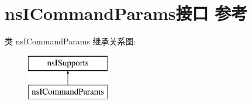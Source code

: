 \hypertarget{interfacens_i_command_params}{}\section{ns\+I\+Command\+Params接口 参考}
\label{interfacens_i_command_params}
类 ns\+I\+Command\+Params 继承关系图\+:\begin{figure}[H]
\begin{center}
\leavevmode
\includegraphics[height=2.000000cm]{interfacens_i_command_params}
\end{center}
\end{figure}
